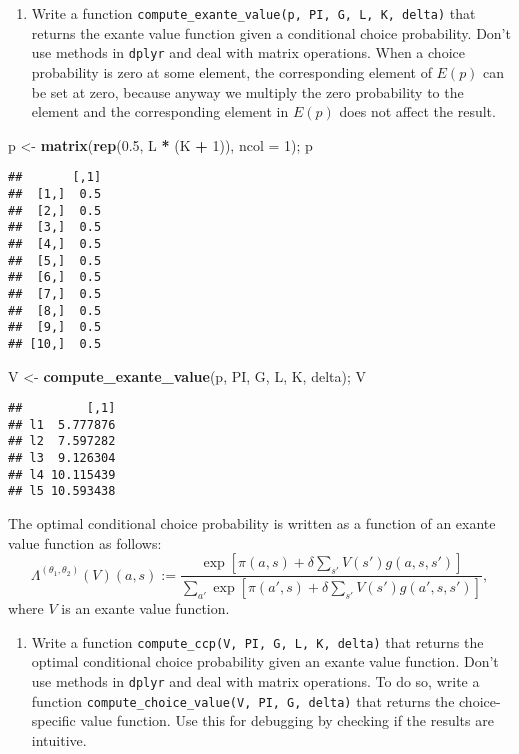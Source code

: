 \documentclass[
]{book}
\newenvironment{Shaded}{\begin{snugshade}}{\end{snugshade}}
\newcommand{\DataTypeTok}[1]{\textcolor[rgb]{0.13,0.29,0.53}{#1}}
\newcommand{\DecValTok}[1]{\textcolor[rgb]{0.00,0.00,0.81}{#1}}
\newcommand{\FloatTok}[1]{\textcolor[rgb]{0.00,0.00,0.81}{#1}}
\newcommand{\KeywordTok}[1]{\textcolor[rgb]{0.13,0.29,0.53}{\textbf{#1}}}
\newcommand{\NormalTok}[1]{#1}
\newcommand{\OperatorTok}[1]{\textcolor[rgb]{0.81,0.36,0.00}{\textbf{#1}}}
\newcommand{\StringTok}[1]{\textcolor[rgb]{0.31,0.60,0.02}{#1}}
\providecommand{\tightlist}{%
  \setlength{\itemsep}{0pt}\setlength{\parskip}{0pt}}
\begin{document}
\begin{enumerate}
\def\labelenumi{\arabic{enumi}.}
\setcounter{enumi}{2}
\tightlist
\item
  Write a function \texttt{compute\_exante\_value(p,\ PI,\ G,\ L,\ K,\ delta)} that returns the exante value function given a conditional choice probability. Don't use methods in \texttt{dplyr} and deal with matrix operations. When a choice probability is zero at some element, the corresponding element of \(E(p)\) can be set at zero, because anyway we multiply the zero probability to the element and the corresponding element in \(E(p)\) does not affect the result.
\end{enumerate}

\begin{Shaded}
\begin{Highlighting}[]
\NormalTok{p <-}\StringTok{ }\KeywordTok{matrix}\NormalTok{(}\KeywordTok{rep}\NormalTok{(}\FloatTok{0.5}\NormalTok{, L }\OperatorTok{*}\StringTok{ }\NormalTok{(K }\OperatorTok{+}\StringTok{ }\DecValTok{1}\NormalTok{)), }\DataTypeTok{ncol =} \DecValTok{1}\NormalTok{); p}
\end{Highlighting}
\end{Shaded}

\begin{verbatim}
##       [,1]
##  [1,]  0.5
##  [2,]  0.5
##  [3,]  0.5
##  [4,]  0.5
##  [5,]  0.5
##  [6,]  0.5
##  [7,]  0.5
##  [8,]  0.5
##  [9,]  0.5
## [10,]  0.5
\end{verbatim}

\begin{Shaded}
\begin{Highlighting}[]
\NormalTok{V <-}\StringTok{ }\KeywordTok{compute_exante_value}\NormalTok{(p, PI, G, L, K, delta); V}
\end{Highlighting}
\end{Shaded}

\begin{verbatim}
##         [,1]
## l1  5.777876
## l2  7.597282
## l3  9.126304
## l4 10.115439
## l5 10.593438
\end{verbatim}

The optimal conditional choice probability is written as a function of an exante value function as follows:
\[
\Lambda^{(\theta_1, \theta_2)}(V)(a, s) := \frac{\exp[\pi(a, s) + \delta \sum_{s'}V(s')g(a, s, s')]}{\sum_{a'}\exp[\pi(a', s) + \delta \sum_{s'}V(s')g(a', s, s')]},
\]
where \(V\) is an exante value function.

\begin{enumerate}
\def\labelenumi{\arabic{enumi}.}
\setcounter{enumi}{3}
\tightlist
\item
  Write a function \texttt{compute\_ccp(V,\ PI,\ G,\ L,\ K,\ delta)} that returns the optimal conditional choice probability given an exante value function. Don't use methods in \texttt{dplyr} and deal with matrix operations. To do so, write a function \texttt{compute\_choice\_value(V,\ PI,\ G,\ delta)} that returns the choice-specific value function. Use this for debugging by checking if the results are intuitive.
\end{enumerate}
\end{document}
